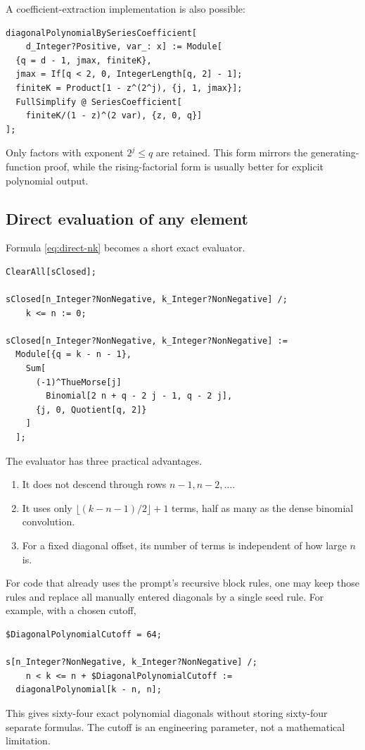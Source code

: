 \documentclass[11pt]{article}
\theoremstyle{definition}
\theoremstyle{remark}
\begin{document}
A coefficient-extraction implementation is also possible:
\begin{lstlisting}[language=Wolfram]
diagonalPolynomialBySeriesCoefficient[
    d_Integer?Positive, var_: x] := Module[
  {q = d - 1, jmax, finiteK},
  jmax = If[q < 2, 0, IntegerLength[q, 2] - 1];
  finiteK = Product[1 - z^(2^j), {j, 1, jmax}];
  FullSimplify @ SeriesCoefficient[
    finiteK/(1 - z)^(2 var), {z, 0, q}]
];
\end{lstlisting}
Only factors with exponent \(2^j\leq q\) are retained.  This form mirrors
the generating-function proof, while the rising-factorial form is usually
better for explicit polynomial output.

\subsection{Direct evaluation of any element}

Formula \cref{eq:direct-nk} becomes a short exact evaluator.

\begin{lstlisting}[language=Wolfram,caption={Direct exact evaluator for any table element.}]
ClearAll[sClosed];

sClosed[n_Integer?NonNegative, k_Integer?NonNegative] /;
    k <= n := 0;

sClosed[n_Integer?NonNegative, k_Integer?NonNegative] :=
  Module[{q = k - n - 1},
    Sum[
      (-1)^ThueMorse[j]
        Binomial[2 n + q - 2 j - 1, q - 2 j],
      {j, 0, Quotient[q, 2]}
    ]
  ];
\end{lstlisting}

The evaluator has three practical advantages.

\begin{enumerate}[leftmargin=2.2em]
\item It does not descend through rows \(n-1,n-2,\ldots\).
\item It uses only \(\lfloor(k-n-1)/2\rfloor+1\) terms, half as many as the
dense binomial convolution.
\item For a fixed diagonal offset, its number of terms is independent of how
large \(n\) is.
\end{enumerate}

For code that already uses the prompt's recursive block rules, one may keep
those rules and replace all manually entered diagonals by a single seed rule.
For example, with a chosen cutoff,
\begin{lstlisting}[language=Wolfram]
$DiagonalPolynomialCutoff = 64;

s[n_Integer?NonNegative, k_Integer?NonNegative] /;
    n < k <= n + $DiagonalPolynomialCutoff :=
  diagonalPolynomial[k - n, n];
\end{lstlisting}
This gives sixty-four exact polynomial diagonals without storing sixty-four
separate formulas.  The cutoff is an engineering parameter, not a
mathematical limitation.
\end{document}
